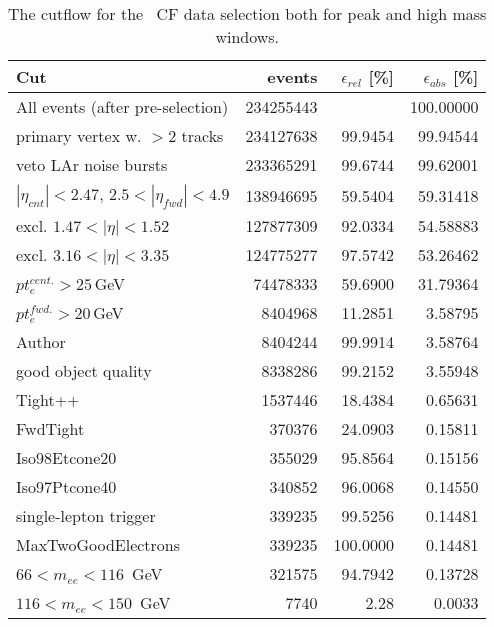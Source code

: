 \begin{table}
\centering
\begin{tabular}{@{}lrrr@{}} \hline \hline
 Cut & events & $\epsilon_{rel}$ [\%] & $\epsilon_{abs}$ [\%] \\\hline
 All events (after pre-selection)  &    234255443 & &   100.00000 \\
 primary vertex w. $>2$ tracks &    234127638 &     99.9454 &    99.94544 \\
 veto LAr noise bursts & 233365291 &     99.6744 &    99.62001 \\
$|\eta_{cnt}| < 2.47$, $2.5<|\eta_{fwd}|<4.9$ &    138946695 &     59.5404 &    59.31418 \\
excl. $1.47 < |\eta| < 1.52$ &    127877309 &     92.0334 &    54.58883 \\
excl. $3.16 < |\eta| < 3.35$ &    124775277 &     97.5742 &    53.26462 \\
$pt_{e}^{cent.} > 25$\,GeV &    74478333 &     59.6900 &    31.79364 \\
$pt_{e}^{fwd.} > 20$\,GeV &      8404968 &     11.2851 &     3.58795 \\
Author &     8404244 &     99.9914 &     3.58764 \\
good object quality &     8338286 &     99.2152 &     3.55948 \\
 Tight++ &      1537446 &     18.4384 &     0.65631 \\
 FwdTight &       370376 &     24.0903 &     0.15811 \\
 Iso98Etcone20 &       355029 &     95.8564 &     0.15156 \\
 Iso97Ptcone40 &       340852 &     96.0068 &     0.14550 \\
 single-lepton trigger &       339235 &     99.5256 &     0.14481 \\
 MaxTwoGoodElectrons &       339235 &    100.0000 &     0.14481 \\\hline
 $66 < m_{ee} < 116$~GeV &       321575 &     94.7942 &     0.13728 \\
 $116 < m_{ee} < 150$~GeV &         7740 &        2.28 &     0.0033 \\ \hline \hline
\end{tabular}
\caption{The cutflow for the \Zee\ CF data selection both for peak and high mass windows.}
\label{tab:sel_cutflow_data}
\end{table}

